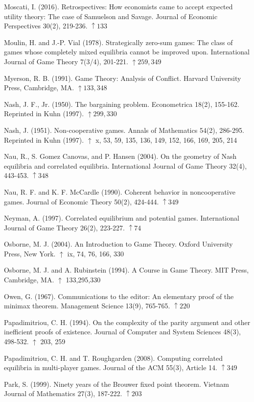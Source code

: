 \documentclass[12pt]{article}
\begin{document}
Moscati, I. (2016). Retrospectives: How economists came to accept expected utility theory: The case of Samuelson and Savage. Journal of Economic Perspectives 30(2), 219-236. $\uparrow 133$

Moulin, H. and J.-P. Vial (1978). Strategically zero-sum games: The class of games whose completely mixed equilibria cannot be improved upon. International Journal of Game Theory 7(3/4), 201-221. $\uparrow 259,349$

Myerson, R. B. (1991). Game Theory: Analysis of Conflict. Harvard University Press, Cambridge, MA. $\uparrow 133,348$

Nash, J. F., Jr. (1950). The bargaining problem. Econometrica 18(2), 155-162. Reprinted in Kuhn (1997). $\uparrow 299,330$

Nash, J. (1951). Non-cooperative games. Annals of Mathematics 54(2), 286-295. Reprinted in Kuhn (1997). $\uparrow$ x, 53, 59, 135, 136, 149, 152, 166, 169, 205, 214

Nau, R., S. Gomez Canovas, and P. Hansen (2004). On the geometry of Nash equilibria and correlated equilibria. International Journal of Game Theory 32(4), 443-453. $\uparrow 348$

Nau, R. F. and K. F. McCardle (1990). Coherent behavior in noncooperative games. Journal of Economic Theory 50(2), 424-444. $\uparrow 349$

Neyman, A. (1997). Correlated equilibrium and potential games. International Journal of Game Theory 26(2), 223-227. $\uparrow 74$

Osborne, M. J. (2004). An Introduction to Game Theory. Oxford University Press, New York. $\uparrow$ ix, 74, 76, 166, 330

Osborne, M. J. and A. Rubinstein (1994). A Course in Game Theory. MIT Press, Cambridge, MA. $\uparrow$ 133,295,330

Owen, G. (1967). Communications to the editor: An elementary proof of the minimax theorem. Management Science 13(9), 765-765. $\uparrow 220$

Papadimitriou, C. H. (1994). On the complexity of the parity argument and other inefficient proofs of existence. Journal of Computer and System Sciences 48(3), 498-532. $\uparrow$ 203, 259

Papadimitriou, C. H. and T. Roughgarden (2008). Computing correlated equilibria in multi-player games. Journal of the ACM 55(3), Article 14. $\uparrow 349$

Park, S. (1999). Ninety years of the Brouwer fixed point theorem. Vietnam Journal of Mathematics 27(3), 187-222. $\uparrow 203$
\end{document}
